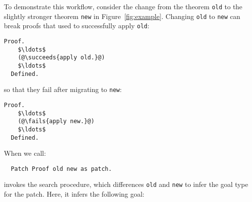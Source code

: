 \begin{figure*}
\begin{minipage}{0.50\textwidth}
\lstset{language=coq, aboveskip=0pt, belowskip=0pt}






\end{minipage}
\hfill
\begin{minipage}{0.50\textwidth}
\lstset{language=coq, aboveskip=0pt, belowskip=0pt}






\end{minipage}
\caption{Two proofs with different conclusions (top) and the
corresponding proof terms (bottom). Highlighted lines correspond to
the change in theorem conclusion (top) and the difference in terms that correspond to a patch (bottom).}
\label{fig:example}
\end{figure*}

To demonstrate this workflow, consider the change from the theorem \lstinline{old} to the slightly stronger theorem \lstinline{new} in Figure~\ref{fig:example}.
Changing \lstinline{old} to \lstinline{new} can break proofs that used to successfully apply \lstinline{old}:

\begin{lstlisting}[language=coq]
  Proof.
    $\ldots$
    (@\succeeds{apply old.}@)
    $\ldots$
  Defined.
\end{lstlisting}
so that they fail after migrating to \lstinline{new}:

\begin{lstlisting}[language=coq]
  Proof.
    $\ldots$
    (@\fails{apply new.}@)
    $\ldots$
  Defined.
\end{lstlisting}
When we call:

\begin{lstlisting}
  Patch Proof old new as patch.
\end{lstlisting}
\sysname invokes the search procedure, which differences \lstinline{old} and \lstinline{new} to infer the goal type for the patch.
Here, it infers the following goal:

